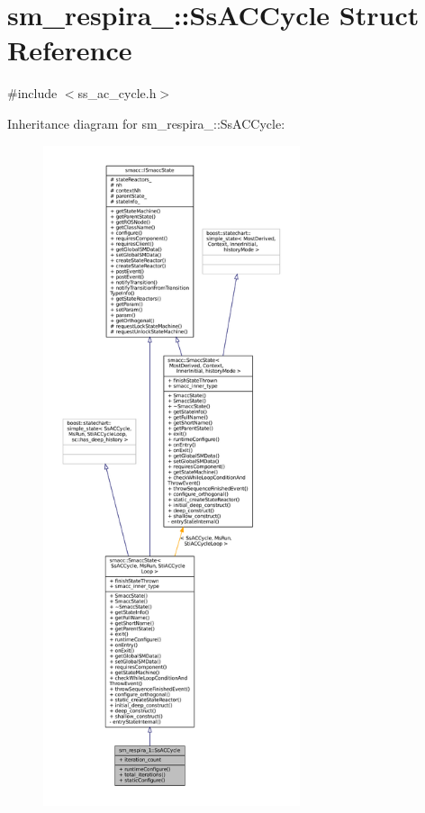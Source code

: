 \hypertarget{structsm__respira__1_1_1SsACCycle}{}\section{sm\+\_\+respira\+\_\+:\+:Ss\+A\+C\+Cycle Struct Reference}
\label{structsm__respira__1_1_1SsACCycle}


{\ttfamily \#include $<$ss\+\_\+ac\+\_\+cycle.\+h$>$}



Inheritance diagram for sm\+\_\+respira\+\_\+:\+:Ss\+A\+C\+Cycle\+:
\nopagebreak
\begin{figure}[H]
\begin{center}
\leavevmode
\includegraphics[height=550pt]{structsm__respira__1_1_1SsACCycle__inherit__graph}
\end{center}
\end{figure}


